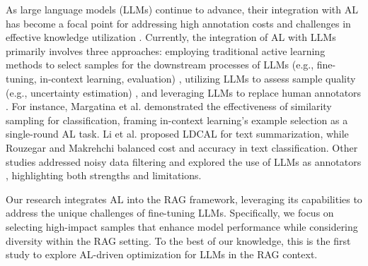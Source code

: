 As large language models (LLMs) continue to advance, their integration with AL has become a focal point for addressing high annotation costs \cite{tan2024large} and challenges in effective knowledge utilization \cite{xu2024activerag}. Currently, the integration of AL with LLMs primarily involves three approaches: employing traditional active learning methods to select samples for the downstream processes of LLMs (e.g., fine-tuning, in-context learning, evaluation) \cite{xie2023active,margatina2023active,bayer2024activellm}, utilizing LLMs to assess sample quality (e.g., uncertainty estimation) \cite{li2024active}, and leveraging LLMs to replace human annotators \cite{xiao2023freeal,kholodna2024llms}. For instance, Margatina et al.  demonstrated the effectiveness of similarity sampling for classification, framing in-context learning’s example selection as a single-round AL task. Li et al.  proposed LDCAL for text summarization, while Rouzegar and Makrehchi  balanced cost and accuracy in text classification. Other studies addressed noisy data filtering \cite{taneja2024can} and explored the use of LLMs as annotators \cite{zhang2023llmaaa}, highlighting both strengths and limitations.

Our research integrates AL into the RAG framework, leveraging its capabilities to address the unique challenges of fine-tuning LLMs. Specifically, we focus on selecting high-impact samples that enhance model performance while considering diversity within the RAG setting. To the best of our knowledge, this is the first study to explore AL-driven optimization for LLMs in the RAG context.